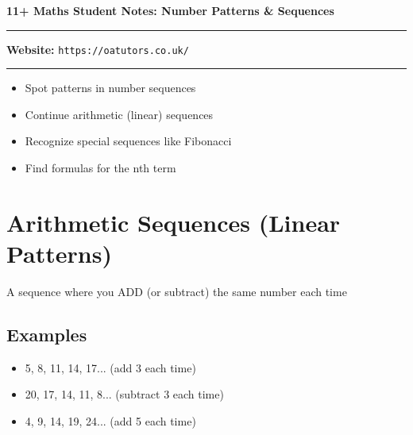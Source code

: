 \documentclass[a4paper,11pt]{article}
\begin{document}
\onehalfspacing


\begin{center}
\textbf{\Large 11+ Maths Student Notes: Number Patterns \& Sequences}
\vspace{0.2cm}
\end{center}

\hrule
\vspace{0.1cm}

\textbf{Website:} \texttt{https://oatutors.co.uk/}

\vspace{0.2cm}
\hrule
\vspace{0.3cm}

\begin{tcolorbox}[colback=blue!5!white,colframe=blue!75!black,title=\textbf{What You'll Learn Today}]
\begin{itemize}
    \item Spot patterns in number sequences
    \item Continue arithmetic (linear) sequences
    \item Recognize special sequences like Fibonacci
    \item Find formulas for the nth term
\end{itemize}
\end{tcolorbox}

\section{Arithmetic Sequences (Linear Patterns)}

\begin{tcolorbox}[colback=green!5!white,colframe=green!75!black,title=\textbf{What's an Arithmetic Sequence?}]
A sequence where you ADD (or subtract) the same number each time
\end{tcolorbox}

\subsection{Examples}
\begin{itemize}
    \item 5, 8, 11, 14, 17... (add 3 each time)
    \item 20, 17, 14, 11, 8... (subtract 3 each time)  
    \item 4, 9, 14, 19, 24... (add 5 each time)
\end{itemize}
\end{document}
